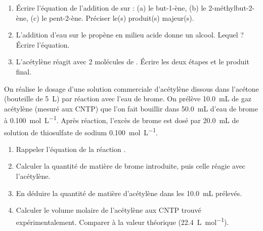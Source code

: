 \documentclass[11pt]{article}
\begin{document}
\begin{exercice}
\begin{enumerate}
  \item Écrire l'équation de l'addition de  sur : (a) le but-1-ène, (b) le 2-méthylbut-2-ène, (c) le pent-2-ène. Préciser le(s) produit(s) majeur(s).
  \item L'addition d'eau sur le propène en milieu acide donne un alcool. Lequel ? Écrire l'équation.
  \item L'acétylène réagit avec 2 molécules de . Écrire les deux étapes et le produit final.
\end{enumerate}
\end{exercice}

\begin{exercice}
On réalise le dosage d'une solution commerciale d'acétylène dissous dans l'acétone (bouteille de \SI{5}{L}) par réaction avec l'eau de brome.
On prélève \SI{10,0}{mL} de gaz acétylène (mesuré aux CNTP) que l'on fait bouillir dans \SI{50,0}{mL} d'eau de brome à \SI{0,100}{mol.L^{-1}}.
Après réaction, l'excès de brome est dosé par \SI{20,0}{mL} de solution de thiosulfate de sodium \SI{0,100}{mol.L^{-1}}.
\begin{enumerate}
  \item Rappeler l'équation de la réaction .
  \item Calculer la quantité de matière de brome introduite, puis celle réagie avec l'acétylène.
  \item En déduire la quantité de matière d'acétylène dans les \SI{10,0}{mL} prélevés.
  \item Calculer le volume molaire de l'acétylène aux CNTP trouvé expérimentalement. Comparer à la valeur théorique (\SI{22,4}{L.mol^{-1}}).
\end{enumerate}
\end{exercice}
\end{document}
